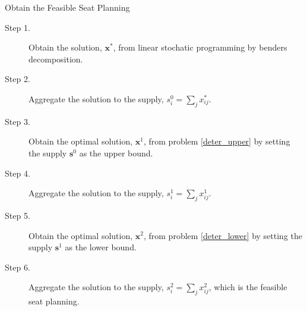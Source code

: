 \begin{frame}{Obtain the Feasible Seat Planning}
      \begin{description}
      \item[Step 1.] Obtain the solution, $\mathbf{x}^{*}$, from linear stochatic programming by benders decomposition.
  
      \item[Step 2.] Aggregate the solution to the supply, ${s}_{i}^{0} = \sum_{j} x^{*}_{ij}$.
  
      \item[Step 3.] Obtain the optimal solution, $\mathbf{x}^{1}$, from problem \eqref{deter_upper} by setting the supply $\mathbf{s}^{0}$ as the upper bound. 
      
      \item[Step 4.] Aggregate the solution to the supply, ${s}_{i}^{1} = \sum_{j} x^{1}_{ij}$.
  
      \item[Step 5.] Obtain the optimal solution, $\mathbf{x}^{2}$, from problem \eqref{deter_lower} by setting the supply $\mathbf{s}^{1}$ as the lower bound. 
      \item[Step 6.] Aggregate the solution to the supply, ${s}_{i}^{2} = \sum_{j} x^{2}_{ij}$, which is the feasible seat planning.
     \end{description}
\end{frame}